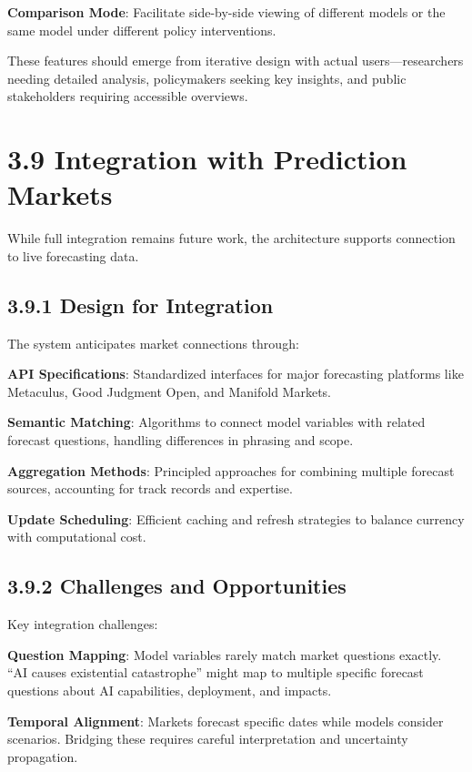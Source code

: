 \documentclass[
  11pt,
  letterpaper,
]{book}
\begin{document}
\textbf{Comparison Mode}: Facilitate side-by-side viewing of different
models or the same model under different policy interventions.

These features should emerge from iterative design with actual
users---researchers needing detailed analysis, policymakers seeking key
insights, and public stakeholders requiring accessible overviews.

\section{3.9 Integration with Prediction
Markets}\label{sec-market-integration}

While full integration remains future work, the architecture supports
connection to live forecasting data.

\subsection{3.9.1 Design for Integration}\label{sec-integration-design}

The system anticipates market connections through:

\textbf{API Specifications}: Standardized interfaces for major
forecasting platforms like Metaculus, Good Judgment Open, and Manifold
Markets.

\textbf{Semantic Matching}: Algorithms to connect model variables with
related forecast questions, handling differences in phrasing and scope.

\textbf{Aggregation Methods}: Principled approaches for combining
multiple forecast sources, accounting for track records and expertise.

\textbf{Update Scheduling}: Efficient caching and refresh strategies to
balance currency with computational cost.

\subsection{3.9.2 Challenges and
Opportunities}\label{sec-market-challenges}

Key integration challenges:

\textbf{Question Mapping}: Model variables rarely match market questions
exactly. ``AI causes existential catastrophe'' might map to multiple
specific forecast questions about AI capabilities, deployment, and
impacts.

\textbf{Temporal Alignment}: Markets forecast specific dates while
models consider scenarios. Bridging these requires careful
interpretation and uncertainty propagation.
\end{document}
